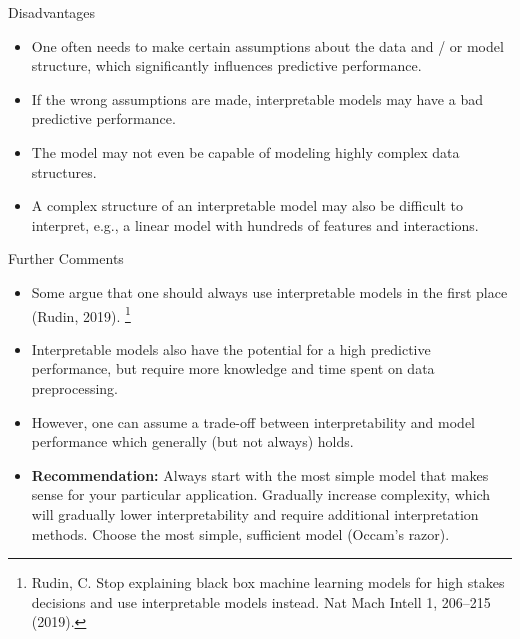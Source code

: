 \documentclass[11pt,compress,t,notes=noshow, xcolor=table]{beamer}
\begin{document}
\begin{vbframe}{Disadvantages}

    \begin{itemize}
    \itemsep2em
        \item One often needs to make certain assumptions about the data and / or model structure, which significantly influences predictive performance.
        \item If the wrong assumptions are made, interpretable models may have a bad predictive performance.
        \item The model may not even be capable of modeling highly complex data structures.
        \item A complex structure of an interpretable model may also be difficult to interpret, e.g., a linear model with hundreds of features and interactions.
    \end{itemize}	
	
\end{vbframe}

\begin{vbframe}{Further Comments}

    \begin{itemize}
    \itemsep1em
        \item Some argue that one should always use interpretable models in the first place (Rudin, 2019).
        \footnote[frame]{Rudin, C. Stop explaining black box machine learning models for high stakes decisions and use interpretable models instead. Nat Mach Intell 1, 206–215 (2019).}
        \item Interpretable models also have the potential for a high predictive performance, but require more knowledge and time spent on data preprocessing.
        \item However, one can assume a trade-off between interpretability and model performance which generally (but not always) holds.
        \item \textbf{Recommendation:} Always start with the most simple model that makes sense for your particular application. Gradually increase complexity, which will gradually lower interpretability and require additional interpretation methods. Choose the most simple, sufficient model (Occam's razor).
    \end{itemize}	
	
\end{vbframe}
\end{document}
